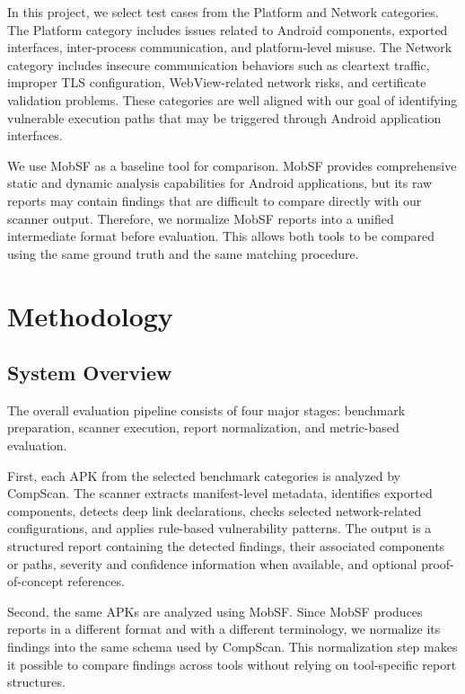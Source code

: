 \documentclass[sigconf, nonacm]{acmart}
\begin{document}
In this project, we select test cases from the Platform and Network categories. The Platform category includes issues related to Android components, exported interfaces, inter-process communication, and platform-level misuse. The Network category includes insecure communication behaviors such as cleartext traffic, improper TLS configuration, WebView-related network risks, and certificate validation problems. These categories are well aligned with our goal of identifying vulnerable execution paths that may be triggered through Android application interfaces.

We use MobSF as a baseline tool for comparison. MobSF provides comprehensive static and dynamic analysis capabilities for Android applications, but its raw reports may contain findings that are difficult to compare directly with our scanner output. Therefore, we normalize MobSF reports into a unified intermediate format before evaluation. This allows both tools to be compared using the same ground truth and the same matching procedure.

\section{Methodology}

\subsection{System Overview}

The overall evaluation pipeline consists of four major stages: benchmark preparation, scanner execution, report normalization, and metric-based evaluation.

First, each APK from the selected benchmark categories is analyzed by CompScan. The scanner extracts manifest-level metadata, identifies exported components, detects deep link declarations, checks selected network-related configurations, and applies rule-based vulnerability patterns. The output is a structured report containing the detected findings, their associated components or paths, severity and confidence information when available, and optional proof-of-concept references.

Second, the same APKs are analyzed using MobSF. Since MobSF produces reports in a different format and with a different terminology, we normalize its findings into the same schema used by CompScan. This normalization step makes it possible to compare findings across tools without relying on tool-specific report structures.
\end{document}
